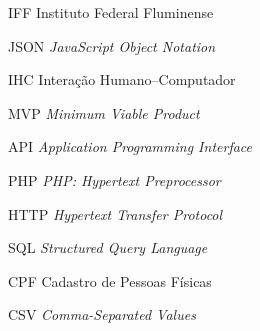\begin{siglas}
  \item[IFF] Instituto Federal Fluminense
  \item[JSON] \textit{JavaScript Object Notation}
  \item[IHC] Interação Humano–Computador
  \item[MVP] \textit{Minimum Viable Product}
  \item[API] \textit{Application Programming Interface}
  \item[PHP] \textit{PHP: Hypertext Preprocessor}
  \item[HTTP] \textit{Hypertext Transfer Protocol}
  \item[SQL] \textit{Structured Query Language}
  \item[CPF] Cadastro de Pessoas Físicas
  \item[CSV] \textit{Comma-Separated Values}
\end{siglas}